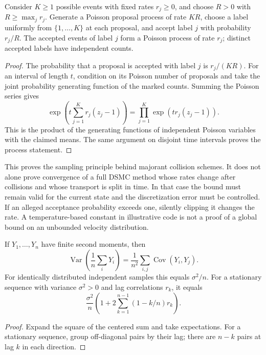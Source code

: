 \begin{proposition}
\label{prop:micro-majorant}
Consider $K\ge1$ possible events with fixed rates $r_j\ge0$, and
choose $R>0$ with $R\ge\max_jr_j$.  Generate a Poisson proposal process of rate
$KR$, choose a label uniformly from $\{1,\ldots,K\}$ at each
proposal, and accept label $j$ with probability $r_j/R$.
The accepted events of label $j$ form a Poisson process of rate
$r_j$; distinct accepted labels have independent counts.
\end{proposition}
\begin{proof}
The probability that a proposal is accepted with label $j$ is
$r_j/(KR)$.  For an interval of length $t$, condition on its
Poisson number of proposals and take the joint probability
generating function of the marked counts.  Summing the Poisson
series gives
\[
 \exp\!\left(t\sum_{j=1}^K r_j(z_j-1)\right)
 =\prod_{j=1}^K\exp(tr_j(z_j-1)).
\]
This is the product of the generating functions of independent
Poisson variables with the claimed means.  The same argument on
disjoint time intervals proves the process statement.
\end{proof}

This proves the sampling principle behind majorant collision schemes.
It does not alone prove convergence of a full DSMC method whose rates
change after collisions and whose transport is split in time.  In that
case the bound must remain valid for the current state and the
discretization error must be controlled.  If an alleged acceptance
probability exceeds one, silently clipping it changes the rate.
A temperature-based constant in illustrative code is not a proof of
a global bound on an unbounded velocity distribution.

\begin{proposition}
\label{prop:micro-sampling}
If $Y_1,\ldots,Y_n$ have finite second moments, then
\[
 \operatorname{Var}\!\left(\frac1n\sum_iY_i\right)
 =\frac1{n^2}\sum_{i,j}\operatorname{Cov}(Y_i,Y_j).
\]
For identically distributed independent samples this equals
$\sigma^2/n$.  For a stationary sequence with variance
$\sigma^2>0$ and lag correlations $r_k$, it equals
\[
 \frac{\sigma^2}{n}
 \left(1+2\sum_{k=1}^{n-1}(1-k/n)r_k\right).
\]
\end{proposition}
\begin{proof}
Expand the square of the centered sum and take expectations.
For a stationary sequence, group off-diagonal pairs by their
lag; there are $n-k$ pairs at lag $k$ in each direction.
\end{proof}

